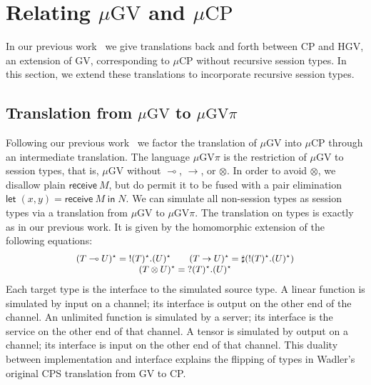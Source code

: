 \documentclass[orivec,envcountsame]{llncs}
\newcommand{\gvdual}[1]{\overline{#1}}
\newcommand{\gvout}[2]{{!#1.#2}}
\newcommand{\gvin}[2]{{?#1.#2}}
\newcommand{\lto}{\ensuremath{\multimap}}
\newcommand{\uto}{\ensuremath{\rightarrow}}
\newcommand{\gvserver}[1]{\flat #1}
\newcommand{\gvservice}[1]{\sharp #1}
\newcommand{\mkwd}[1]{\mathsf{#1}}
\newcommand{\gvreceive}[1]{\mkwd{receive}\:#1}
\newcommand{\gvlet}[3]{\mkwd{let}\;#1 = #2\;\mkwd{in}\;#3}
\newcommand{\topi}[1]{({#1})^\star}
\newcommand{\mucp}{$\mu\mathrm{CP}$\xspace}
\newcommand{\mugv}{$\mu\mathrm{GV}$\xspace}
\newcommand{\gvpi}{$\mu\mathrm{GV}\pi$\xspace}
\newcommand{\ba}{\begin{array}}
\newcommand{\ea}{\end{array}}
\begin{document}
\section{Relating \mugv and \mucp}\label{sec:translation}

In our previous work~\citep{LindleyM14} we give translations back and forth between CP and HGV, an
extension of GV, corresponding to \mucp without recursive session types. In this section, we extend
these translations to incorporate recursive session types.

\subsection{Translation from \mugv to \gvpi}\label{sec:gvtogvpi}

Following our previous work~\citep{LindleyM14} we factor the
translation of \mugv into \mucp through an intermediate
translation. The language \gvpi is the restriction of \mugv to session
types, that is, \mugv without $\lto$, $\uto$, or $\otimes$. In order
to avoid $\otimes$, we disallow plain $\gvreceive{M}$, but do permit
it to be fused with a pair elimination $\gvlet{(x,
  y)}{\gvreceive{M}}{N}$. We can simulate all non-session types as
session types via a translation from \mugv to \gvpi.  The translation
on types is exactly as in our previous work. It is given by the
homomorphic extension of the following equations:
\[\small
\ba{@{}c@{}}
\topi{T \lto U} = \gvout{\topi{T}}{\topi{U}} \qquad
\topi{T \uto U} = \gvservice{(\gvout{\topi{T}}{\topi{U}})} \\
\topi{T \otimes U} = \gvin{\topi{T}}{\topi{U}} \\
\ea
\]
Each target type is the interface to the simulated source type. A
linear function is simulated by input on a channel; its interface is
output on the other end of the channel. An unlimited function is
simulated by a server; its interface is the service on the other end
of that channel. A tensor is simulated by output on a channel; its
interface is input on the other end of that channel. This duality
between implementation and interface explains the flipping of types in
Wadler's original CPS translation from GV to CP.
\end{document}
